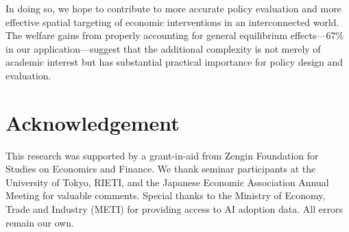 In doing so, we hope to contribute to more accurate policy evaluation and more effective spatial targeting of economic interventions in an interconnected world. The welfare gains from properly accounting for general equilibrium effects—67\% in our application—suggest that the additional complexity is not merely of academic interest but has substantial practical importance for policy design and evaluation.

\section*{Acknowledgement}
This research was supported by a grant-in-aid from Zengin Foundation for Studies on Economics and Finance. We thank seminar participants at the University of Tokyo, RIETI, and the Japanese Economic Association Annual Meeting for valuable comments. Special thanks to the Ministry of Economy, Trade and Industry (METI) for providing access to AI adoption data. All errors remain our own.

\newpage



